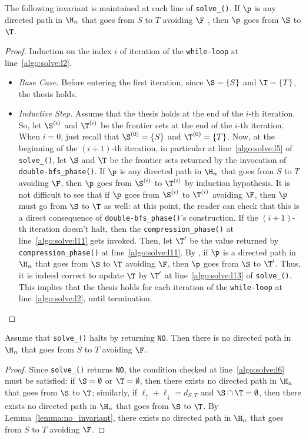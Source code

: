 \begin{lemma}\label{lemma:no_invariant}
The following invariant is maintained at each line of \texttt{solve\_\mainproblem()}.
If $\p$ is any directed path in $\H_n$ that goes from $S$ to $T$ avoiding $\F$ ,
then $\p$ goes from $\S$ to $\T$.
\end{lemma}
\begin{proof}
Induction on the index $i$ of iteration of the \texttt{while-loop} at line~\ref{algo:solve:l2}.
\begin{itemize}
\item \emph{Base Case.} Before entering the first iteration,
since $\S=\{S\}$ and $\T=\{T\}$, the thesis holds.
\item \emph{Inductive Step.} Assume that the thesis holds at the end of the $i$-th iteration.
So, let $\S^{(i)}$ and $\T^{(i)}$ be the frontier sets at the end of the $i$-th iteration.
When $i=0$, just recall that $\S^{(0)}=\{S\}$ and $\T^{(0)}=\{T\}$.
Now, at the beginning of the $(i+1)$-th iteration,
in particular at line~\ref{algo:solve:l5} of \texttt{solve\_\mainproblem()},
let $\S$ and $\T$ be the frontier sets returned by the invocation of \texttt{double-bfs\_phase()}.
If $\p$ is any directed path in $\H_n$ that goes from $S$ to $T$ avoiding $\F$,
then $\p$ goes from $\S^{(i)}$ to $\T^{(i)}$ by induction hypothesis.
It is not difficult to see that if $\p$ goes from $\S^{(i)}$ to $\T^{(i)}$ avoiding $\F$,
then $\p$ must go from $\S$ to $\T$ as well:
at this point, the reader can check that this is
a direct consequence of \texttt{double-bfs\_phase()}'s construction.
If the $(i+1)$-th iteration doesn't halt,
then the \texttt{compression\_phase()} at line~\ref{algo:solve:l11} gets invoked.
Then, let $\T'$ be the value returned by \texttt{compression\_phase()} at line~\ref{algo:solve:l11}.
By ,
if $\p$ is a directed path in $\H_n$ that goes from $\S$ to $\T$ avoiding $\F$, then $\p$ goes from $\S$ to $\T'$.
Thus, it is indeed correct to update $\T$ by $\T'$ at line~\ref{algo:solve:l13} of \texttt{solve\_\mainproblem()}.
This implies that the thesis holds for each iteration of the \texttt{while-loop} at line~\ref{algo:solve:l2},
until termination.
\end{itemize}
\end{proof}

\begin{proposition}\label{prop:correctness_no}
Assume that \texttt{solve\_\mainproblem()} halts by returning \texttt{NO}.
Then there is no directed path in $\H_n$ that goes from $S$ to $T$ avoiding $\F$.
\end{proposition}
\begin{proof}
Since \texttt{solve\_\mainproblem()} returns \texttt{NO},
the condition checked at line~\ref{algo:solve:l6} must be satisfied:
if $\S=\emptyset$ or $\T=\emptyset$, then there exists no directed path in $\H_n$ that goes from $\S$ to $\T$;
similarly, if $\ell_\uparrow+\ell_\downarrow=d_{S,T}$ and $\S\cap\T=\emptyset$,
then there exists no directed path in $\H_n$ that goes from $\S$ to $\T$.
By Lemma~\ref{lemma:no_invariant},
there exists no directed path in $\H_n$ that goes from $S$ to $T$ avoiding $\F$.
\end{proof}

